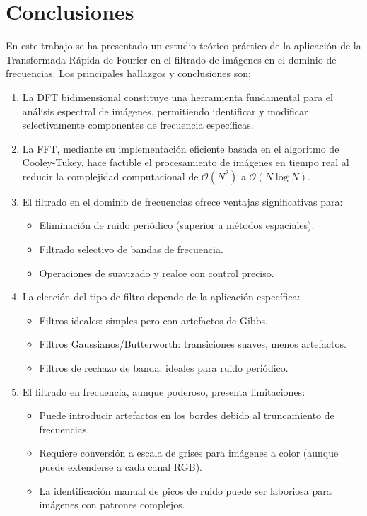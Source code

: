 \documentclass[conference]{IEEEtran}
\begin{document}
\section{Conclusiones}

En este trabajo se ha presentado un estudio teórico-práctico de la aplicación de la Transformada Rápida de Fourier en el filtrado de imágenes en el dominio de frecuencias. Los principales hallazgos y conclusiones son:

\begin{enumerate}
    \item La DFT bidimensional constituye una herramienta fundamental para el análisis espectral de imágenes, permitiendo identificar y modificar selectivamente componentes de frecuencia específicas.
    
    \item La FFT, mediante su implementación eficiente basada en el algoritmo de Cooley-Tukey, hace factible el procesamiento de imágenes en tiempo real al reducir la complejidad computacional de $\mathcal{O}(N^2)$ a $\mathcal{O}(N \log N)$.
    
    \item El filtrado en el dominio de frecuencias ofrece ventajas significativas para:
    \begin{itemize}
        \item Eliminación de ruido periódico (superior a métodos espaciales).
        \item Filtrado selectivo de bandas de frecuencia.
        \item Operaciones de suavizado y realce con control preciso.
    \end{itemize}
    
    \item La elección del tipo de filtro depende de la aplicación específica:
    \begin{itemize}
        \item Filtros ideales: simples pero con artefactos de Gibbs.
        \item Filtros Gaussianos/Butterworth: transiciones suaves, menos artefactos.
        \item Filtros de rechazo de banda: ideales para ruido periódico.
    \end{itemize}
    
    \item El filtrado en frecuencia, aunque poderoso, presenta limitaciones:
    \begin{itemize}
        \item Puede introducir artefactos en los bordes debido al truncamiento de frecuencias.
        \item Requiere conversión a escala de grises para imágenes a color (aunque puede extenderse a cada canal RGB).
        \item La identificación manual de picos de ruido puede ser laboriosa para imágenes con patrones complejos.
    \end{itemize}
\end{enumerate}
\end{document}
